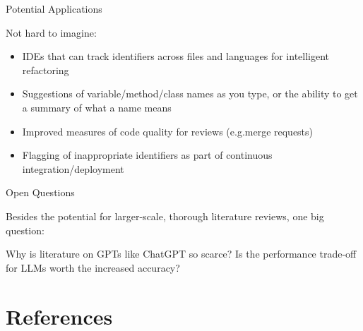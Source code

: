 \begin{frame}{Potential Applications}

    Not hard to imagine:

    \begin{itemize}
        \setlength{\itemsep}{1.1ex}
        \item

         IDEs that can track identifiers across files and languages for intelligent
         refactoring

         \item

         Suggestions of variable/method/class names as you type, or the ability to get a
         summary of what a name means

         \item

         Improved measures of code quality for reviews (e.g.\@ merge requests)

         \item

         Flagging of inappropriate identifiers as part of continuous
         integration/deployment

    \end{itemize}

\end{frame}

\begin{frame}{Open Questions}

    Besides the potential for larger-scale, thorough literature reviews, one big question:

    \vspace*{\baselineskip}

    \begin{m-question}
        Why is literature on \acfp{GPT} like ChatGPT so scarce? Is the performance
        trade-off for \acsp{LLM} worth the increased accuracy?
    \end{m-question}

\end{frame}


\jkulogo


\section{References}
\label{sec:References}

